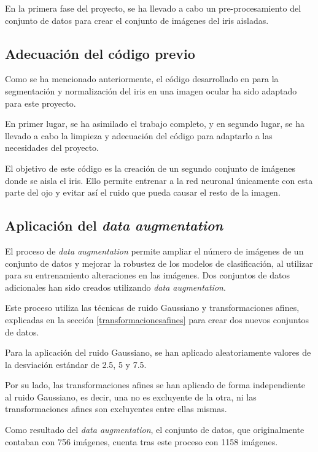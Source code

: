 En la primera fase del proyecto, se ha llevado a cabo un pre-procesamiento del conjunto de datos para crear el conjunto de imágenes del iris aisladas.

\subsection{Adecuación del código previo}

Como se ha mencionado anteriormente, el código desarrollado en \cite{tfg_iris_2020} para la segmentación y normalización del iris en una imagen ocular ha sido adaptado para este proyecto. 

En primer lugar, se ha asimilado el trabajo completo, y en segundo lugar, se ha llevado a cabo la limpieza y adecuación del código para adaptarlo a las necesidades del proyecto. 

El objetivo de este código es la creación de un segundo conjunto de imágenes donde se aisla el iris. Ello permite entrenar a la red neuronal únicamente con esta parte del ojo y evitar así el ruido que pueda causar el resto de la imagen. 

\subsection{Aplicación del \textit{data augmentation}}

El proceso de \textit{data augmentation} permite ampliar el número de imágenes de un conjunto de datos y mejorar la robustez de los modelos de clasificación, al utilizar para su entrenamiento alteraciones en las imágenes. 
Dos conjuntos de datos adicionales han sido creados utilizando \textit{data augmentation}.

Este proceso utiliza las técnicas de ruido Gaussiano y transformaciones afines, explicadas en la sección \ref{transformacionesafines} para crear dos nuevos conjuntos de datos. 

Para la aplicación del ruido Gaussiano, se han aplicado aleatoriamente valores de la desviación estándar de 2.5, 5 y 7.5.

Por su lado, las transformaciones afines se han aplicado de forma independiente al ruido Gaussiano, es decir, una no es excluyente de la otra, ni las transformaciones afines son excluyentes entre ellas mismas. 

Como resultado del \textit{data augmentation}, el conjunto de datos, que originalmente contaban con 756 imágenes, cuenta tras este proceso con 1158 imágenes.

